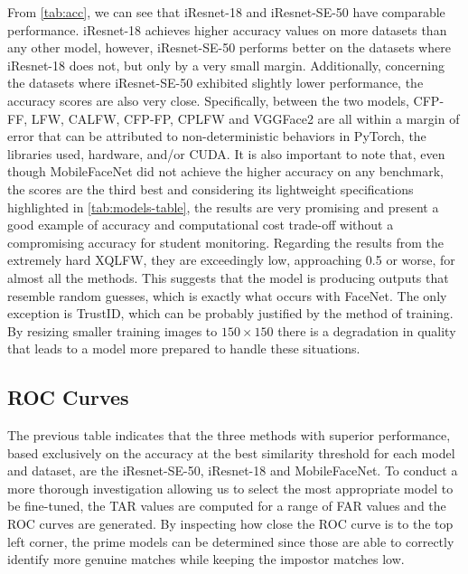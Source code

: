 \documentclass[class=report, crop=false, a4paper, 12pt]{standalone}
\begin{document}
\par From \autoref{tab:acc}, we can see that iResnet-18 and iResnet-SE-50 have comparable performance. iResnet-18 achieves higher accuracy values on more datasets than any other model, however, iResnet-SE-50 performs better on the datasets where iResnet-18 does not, but only by a very small margin. Additionally, concerning the datasets where iResnet-SE-50 exhibited slightly lower performance, the accuracy scores are also very close. Specifically, between the two models, CFP-FF, LFW, CALFW, CFP-FP, CPLFW and VGGFace2 are all within a margin of error that can be attributed to non-deterministic behaviors in PyTorch, the libraries used, hardware, and/or CUDA. It is also important to note that, even though MobileFaceNet did not achieve the higher accuracy on any benchmark, the scores are the third best and considering its lightweight specifications highlighted in \autoref{tab:models-table}, the results are very promising and present a good example of accuracy and computational cost trade-off without a compromising accuracy for student monitoring. Regarding the results from the extremely hard XQLFW, they are exceedingly low, approaching 0.5 or worse, for almost all the methods. This suggests that the model is producing outputs that resemble random guesses, which is exactly what occurs with FaceNet. The only exception is TrustID, which can be probably justified by the method of training. By resizing smaller training images to $150\times150$ there is a degradation in quality that leads to a model more prepared to handle these situations. 


\subsection{ROC Curves}
\par The previous table indicates that the three methods with superior performance, based exclusively on the accuracy at the best similarity threshold for each model and dataset, are the iResnet-SE-50, iResnet-18 and MobileFaceNet. To conduct a more thorough investigation allowing us to select the most appropriate model to be fine-tuned, the TAR values are computed for a range of FAR values and the ROC curves are generated. By inspecting how close the ROC curve is to the top left corner, the prime models can be determined since those are able to correctly identify more genuine matches while keeping the impostor matches low. 
\end{document}
